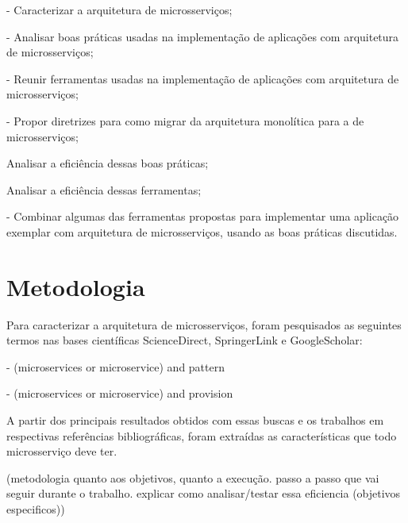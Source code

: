 - Caracterizar a arquitetura de microsserviços;

- Analisar boas práticas usadas na implementação de aplicações com arquitetura de microsserviços;

- Reunir ferramentas usadas na implementação de aplicações com arquitetura de microsserviços;

- Propor diretrizes para como migrar da arquitetura monolítica para a de microsserviços;

Analisar a eficiência dessas boas práticas;

Analisar a eficiência dessas ferramentas;

- Combinar algumas das ferramentas propostas para implementar uma aplicação exemplar com arquitetura de microsserviços, usando as boas práticas discutidas.

\section{Metodologia}

Para caracterizar a arquitetura de microsserviços, foram pesquisados as seguintes termos nas bases científicas ScienceDirect, SpringerLink e GoogleScholar:

- (microservices or microservice) and pattern

- (microservices or microservice) and provision

A partir dos principais resultados obtidos com essas buscas e os trabalhos em respectivas referências bibliográficas, foram extraídas as características que todo microsserviço deve ter.

(metodologia quanto aos objetivos, quanto a execução. passo a passo que vai seguir durante o trabalho. explicar como analisar/testar essa eficiencia (objetivos especificos))